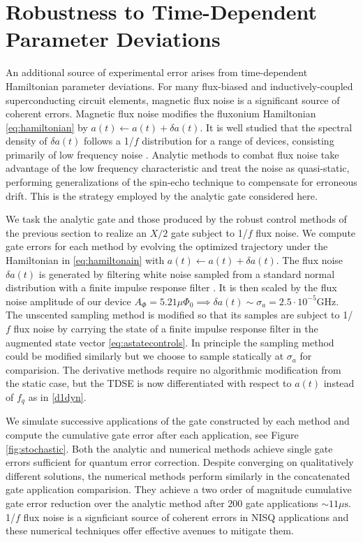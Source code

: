 \section{Robustness to Time-Dependent Parameter Deviations \label{sec:stochastic}}
An additional source of experimental error arises from time-dependent
Hamiltonian parameter deviations. For many flux-biased and inductively-coupled
superconducting circuit elements, magnetic flux noise is a significant
source of coherent errors. Magnetic flux noise
modifies the fluxonium Hamiltonian \eqref{eq:hamiltonian}
by $a(t) \gets a(t) + \delta a(t)$.
It is well studied that the spectral density of $\delta a(t)$ follows a
1/$f$ distribution for a range of devices, consisting primarily of low frequency
noise . Analytic methods to combat flux noise
take advantage of the low frequency characteristic and
treat the noise as quasi-static, performing generalizations of the spin-echo technique
to compensate for erroneous drift. This is the strategy employed by the analytic gate
considered here.

We task the analytic gate and those produced by
the robust control methods of the previous section
to realize an $X/2$ gate subject to 1/$f$ flux noise.
We compute gate errors for each method
by evolving the optimized trajectory under the Hamiltonian in \eqref{eq:hamiltonain}
with $a(t) \gets a(t) + \delta a(t)$.
The flux noise $\delta a(t)$ is generated by
filtering white noise sampled from a standard normal distribution with a finite
impulse response filter \cite{saspweb2011}.
It is then scaled by the 
flux noise amplitude of our device $A_{\Phi} = 5.21 \mu \Phi_{0} \implies
\delta a (t) \sim \sigma_{a} = 2.5 \cdot 10^{-5} \textrm{GHz}$.
The unscented sampling method is modified so that its samples
are subject to 1/$f$ flux noise by carrying the state of a finite impulse response filter
in the augmented state vector \eqref{eq:astatecontrols}.
In principle the sampling method could be modified
similarly but we choose to sample statically at $\sigma_{a}$ for comparision.
The derivative methods require no algorithmic modification from the static case,
but the TDSE is now differentiated with respect to $a(t)$ instead of $f_{q}$ as
in \eqref{d1dyn}.

We simulate successive applications of the gate constructed by each method
and compute the cumulative gate error
after each application, see Figure \ref{fig:stochastic}. Both the analytic
and numerical methods achieve single gate errors
sufficient for quantum error correction.
Despite converging on qualitatively different solutions, the
numerical methods perform similarly in the concatenated
gate application comparision. They achieve a two
order of magnitude cumulative gate error reduction over the analytic method after $200$
gate applications $\sim 11 \mu\textrm{s}$.
1/$f$ flux noise is a signficiant source of coherent errors in NISQ applications and
these numerical techniques offer effective avenues to mitigate them.
